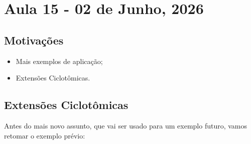 \documentclass[../algebraIII_notes.tex]{subfiles}
\begin{document}
\section{Aula 15 - 02 de Junho, 2026}
\subsection{Motivações}
\begin{itemize}
	\item Mais exemplos de aplicação;
	\item Extensões Ciclotômicas.
\end{itemize}
\subsection{Extensões Ciclotômicas}
Antes do mais novo assunto, que vai ser usado para um exemplo futuro, vamos retomar o exemplo prévio:
\end{document}
